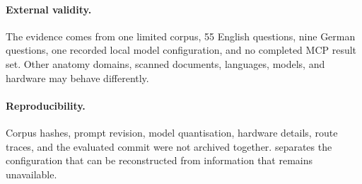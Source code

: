 \paragraph{External validity.}
The evidence comes from one limited corpus, 55 English questions, nine German questions, one recorded local model configuration, and no completed MCP result set. Other anatomy domains, scanned documents, languages, models, and hardware may behave differently.

\paragraph{Reproducibility.}
Corpus hashes, prompt revision, model quantisation, hardware details, route traces, and the evaluated commit were not archived together.  separates the configuration that can be reconstructed from information that remains unavailable.

